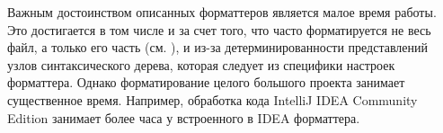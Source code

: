 Важным достоинством описанных форматтеров является малое время работы.
Это достигается в том числе и за счет того, что часто форматируется не весь
файл, а только его часть (см. \cite{eclipse}),
и из-за детерминированности представлений узлов синтаксического дерева,
которая следует из специфики настроек форматтера.
Однако форматирование целого большого проекта занимает существенное время.
Например, обработка кода IntelliJ IDEA Community Edition занимает более часа
у встроенного в IDEA форматтера.

